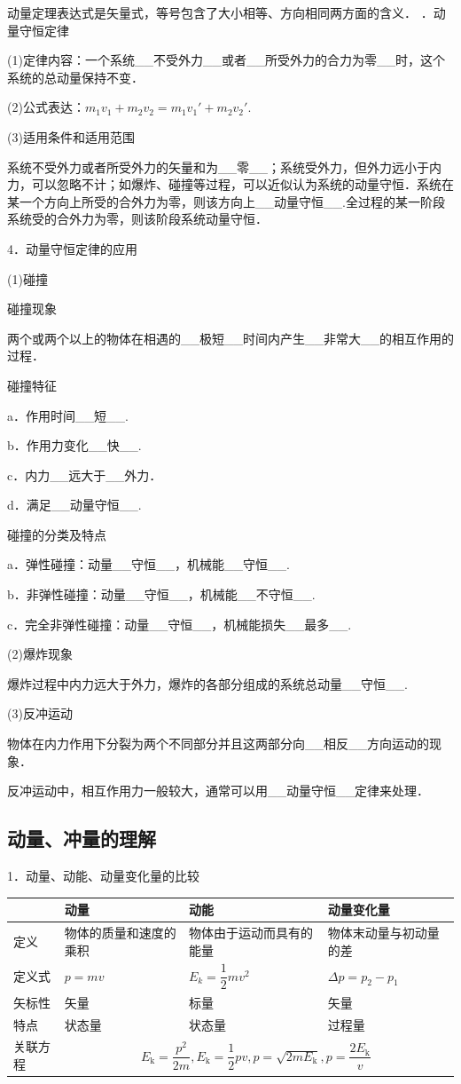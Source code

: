 \documentclass[cn,10.5pt,chinese,mac,chinesefont=founder]{elegantbook}
\begin{document}
动量定理表达式是矢量式，等号包含了大小相等、方向相同两方面的含义．
．动量守恒定律

(1)定律内容：一个系统\_\_不受外力\_\_或者\_\_所受外力的合力为零\_\_时，这个系统的总动量保持不变．

(2)公式表达：$m_1v_1+m_2v_2=m_1v_1'+m_2v_2'$.

(3)适用条件和适用范围

系统不受外力或者所受外力的矢量和为\_\_零\_\_；系统受外力，但外力远小于内力，可以忽略不计；如爆炸、碰撞等过程，可以近似认为系统的动量守恒．系统在某一个方向上所受的合外力为零，则该方向上\_\_动量守恒\_\_.全过程的某一阶段系统受的合外力为零，则该阶段系统动量守恒．

4．动量守恒定律的应用

(1)碰撞

碰撞现象

两个或两个以上的物体在相遇的\_\_极短\_\_时间内产生\_\_非常大\_\_的相互作用的过程．

碰撞特征

a．作用时间\_\_短\_\_.

b．作用力变化\_\_快\_\_.

c．内力\_\_远大于\_\_外力．

d．满足\_\_动量守恒\_\_.

碰撞的分类及特点

a．弹性碰撞：动量\_\_守恒\_\_，机械能\_\_守恒\_\_.

b．非弹性碰撞：动量\_\_守恒\_\_，机械能\_\_不守恒\_\_.

c．完全非弹性碰撞：动量\_\_守恒\_\_，机械能损失\_\_最多\_\_.

(2)爆炸现象

爆炸过程中内力远大于外力，爆炸的各部分组成的系统总动量\_\_守恒\_\_.

(3)反冲运动

物体在内力作用下分裂为两个不同部分并且这两部分向\_\_相反\_\_方向运动的现象．

反冲运动中，相互作用力一般较大，通常可以用\_\_动量守恒\_\_定律来处理．

\newpage
\subsection{动量、冲量的理解}

1．动量、动能、动量变化量的比较

\begin{longtable}[]{@{}llll@{}}
\toprule
& 
动量
&
动能
&动量变化量
\tabularnewline
\midrule
\endhead
定义 & 物体的质量和速度的乘积 & 物体由于运动而具有的能量 &
物体末动量与初动量的差\tabularnewline
定义式 & $p=mv$ & $E_k=\dfrac{1}{2} mv^2$ & $\Delta p=p_2-p_1$\tabularnewline
矢标性 & 矢量 & 标量 & 矢量\tabularnewline
特点 & 状态量 & 状态量 & 过程量\tabularnewline
关联方程 &\multicolumn{3}{c}{ $E_{\mathrm{k}}=\dfrac{p^{2}}{2 m}, E_{\mathrm{k}}=\dfrac{1}{2} p v, p=\sqrt{2 m E_{\mathrm{k}}}, p=\dfrac{2 E_{\mathrm{k}}}{v}$}\tabularnewline
\bottomrule
\end{longtable}
\end{document}

